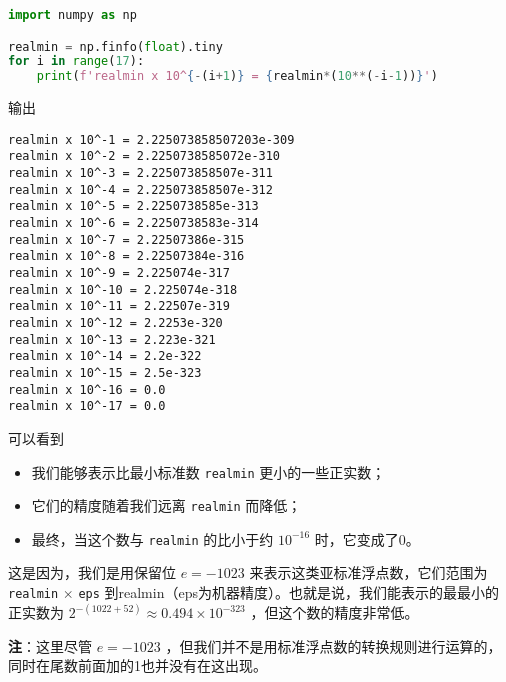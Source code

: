 \begin{lstlisting}[language=python]
import numpy as np

realmin = np.finfo(float).tiny
for i in range(17):
    print(f'realmin x 10^{-(i+1)} = {realmin*(10**(-i-1))}')
\end{lstlisting}

输出

\begin{lstlisting}[language={}]
realmin x 10^-1 = 2.225073858507203e-309
realmin x 10^-2 = 2.2250738585072e-310
realmin x 10^-3 = 2.225073858507e-311
realmin x 10^-4 = 2.225073858507e-312
realmin x 10^-5 = 2.2250738585e-313
realmin x 10^-6 = 2.2250738583e-314
realmin x 10^-7 = 2.22507386e-315
realmin x 10^-8 = 2.22507384e-316
realmin x 10^-9 = 2.225074e-317
realmin x 10^-10 = 2.225074e-318
realmin x 10^-11 = 2.22507e-319
realmin x 10^-12 = 2.2253e-320
realmin x 10^-13 = 2.223e-321
realmin x 10^-14 = 2.2e-322
realmin x 10^-15 = 2.5e-323
realmin x 10^-16 = 0.0
realmin x 10^-17 = 0.0
\end{lstlisting}

可以看到

\begin{itemize}
\item 我们能够表示比最小标准数 \verb|realmin| 更小的一些正实数；
\item 它们的精度随着我们远离 \verb|realmin| 而降低；
\item 最终，当这个数与 \verb|realmin| 的比小于约  $10^{-16}$  时，它变成了0。
\end{itemize}
这是因为，我们是用保留位  $e=-1023$  来表示这类亚标准浮点数，它们范围为 \verb|realmin|   $\times$   \verb|eps| 到realmin（eps为机器精度）。也就是说，我们能表示的最最小的正实数为  $2^{-(1022+52)}\approx 0.494\times10^{-323}$  ，但这个数的精度非常低。

\textbf{注}：这里尽管  $e=-1023$  ，但我们并不是用标准浮点数的转换规则进行运算的，同时在尾数前面加的1也并没有在这出现。
